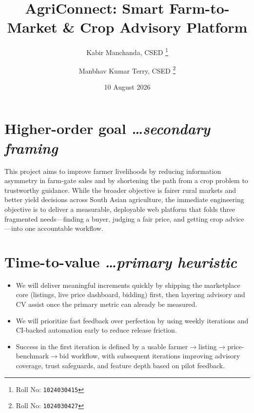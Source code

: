 \documentclass[11pt,a4paper]{article}
\title{AgriConnect: Smart Farm-to-Market \& Crop Advisory Platform}
\author{
  Kabir Manchanda, CSED%
  \thanks{Roll No: \texttt{1024030415}}
  \and
  Manbhav Kumar Terry, CSED%
  \thanks{Roll No: \texttt{1024030427}}
}
\date{10 August 2026}
\newcommand{\BvrHint}[1]{%
  {\normalfont\normalsize\itshape\hfill #1}}
\begin{document}
\maketitle

\section{Higher-order goal%
  \BvrHint{\ldots secondary framing}}
This project aims to improve farmer livelihoods by reducing information asymmetry in farm-gate sales and by shortening the path from a crop problem to trustworthy guidance. While the broader objective is fairer rural markets and better yield decisions across South Asian agriculture, the immediate engineering objective is to deliver a measurable, deployable web platform that folds three fragmented needs---finding a buyer, judging a fair price, and getting crop advice---into one accountable workflow.

\section{Time-to-value %
  \BvrHint{\ldots primary heuristic}}
\begin{itemize}[leftmargin=0.7cm]
    \item We will deliver meaningful increments quickly by shipping the marketplace core (listings, live price dashboard, bidding) first, then layering advisory and CV assist once the primary metric can already be measured.
    \item We will prioritize fast feedback over perfection by using weekly iterations and CI-backed automation early to reduce release friction.
    \item Success in the first iteration is defined by a usable farmer$\rightarrow$listing$\rightarrow$price-benchmark$\rightarrow$bid workflow, with subsequent iterations improving advisory coverage, trust safeguards, and feature depth based on pilot feedback.
\end{itemize}
\end{document}
